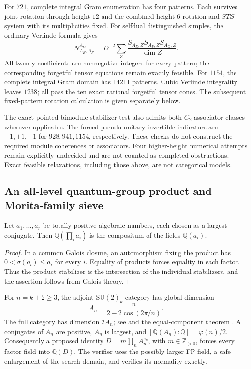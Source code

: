 For $721$, complete integral Gram enumeration has four patterns.
Each survives joint rotation through height $12$ and the combined
height-$6$ rotation and $STS$ system with its multiplicities fixed.
For selfdual distinguished simples, the ordinary Verlinde formula gives
\[
 N_{A_E,A_F}^{A_G}
 =D^{-2}\sum_Z
 \frac{S_{A_E,Z}S_{A_F,Z}S_{A_G,Z}}{\dim Z}.
\]
All twenty coefficients are nonnegative integers for every pattern;
the corresponding forgetful tensor equations remain exactly feasible.
For $1154$, the complete integral Gram domain has $14211$ patterns.
Cubic Verlinde integrality leaves $1238$; all pass the ten exact rational
forgetful tensor cones. The subsequent fixed-pattern rotation calculation
is given separately below.

The exact pointed-bimodule stabilizer test also admits both $C_2$
associator classes wherever applicable. The forced pseudo-unitary
invertible indicators are $-1,+1,-1$ for $928,941,1154$, respectively.
These checks do not construct the required module coherences or
associators. Four higher-height numerical attempts remain explicitly
undecided and are not counted as completed obstructions. Exact feasible
relaxations, including those above, are not categorical models.

\subsection{An all-level quantum-group product and Morita-family sieve}
\label{subsec:frontier-all-level-su2}

\begin{lemma}
Let $a_1,\ldots,a_r$ be totally positive algebraic numbers, each chosen
as a largest conjugate. Then
$\mathbb Q(\prod_i a_i)$ is the compositum of the fields $\mathbb Q(a_i)$.
\end{lemma}
\begin{proof}
In a common Galois closure, an automorphism fixing the product has
$0<\sigma(a_i)\le a_i$ for every $i$. Equality of products forces equality
in each factor. Thus the product stabilizer is the intersection of the
individual stabilizers, and the assertion follows from Galois theory.
\end{proof}

For $n=k+2\ge3$, the adjoint $\mathrm{SU}(2)_k$ category has global
dimension
\[
 A_n=\frac{n}{2-2\cos(2\pi/n)}.
\]
The full category has dimension $2A_n$; see
\cite[p.~8]{CoquereauxQuantumMcKay}
and the equal-component theorem \cite[Proposition~8.20]{ENO}.
All conjugates of $A_n$ are positive, $A_n$ is largest, and
$[\mathbb Q(A_n):\mathbb Q]=\varphi(n)/2$.
Consequently a proposed identity $D=m\prod_n A_n^{e_n}$, with
$m\in\mathbb Z_{>0}$, forces every factor field into $\mathbb Q(D)$.
The verifier uses the possibly larger FP field, a safe enlargement of
the search domain, and verifies its normality exactly.

